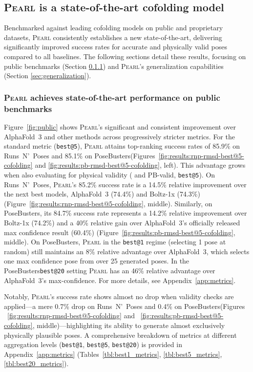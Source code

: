 \documentclass[11pt, letterpaper, onecolumn]{tau-class/tau}
\makeatletter
\newcommand{\pearl}{\textsc{Pearl}\xspace}
\newcommand{\alphafold}[1]{AlphaFold~#1\xspace}
\newcommand{\boltz}[1]{\mbox{Boltz-#1\xspace}}
\newcommand{\best}[1]{\texttt{best@#1}\xspace}
\newcommand{\rmsdtwoa}{\text{RMSD\,\raisebox{0.25ex}{\scriptsize <}\,2\,\AA}\xspace}
\newcommand{\runsnposes}{Runs~N'~Poses\xspace}
\newcommand{\posebusters}{PoseBusters\xspace}
\let\oldAA\AA
\renewcommand{\AA}{\oldAA\xspace}
\makeatother
\begin{document}
\subsection{\pearl is a state-of-the-art cofolding model}
\label{sec:results:cofolding}

Benchmarked against leading cofolding models on public and proprietary datasets, \pearl consistently establishes a new state-of-the-art, delivering significantly improved success rates for accurate and physically valid poses compared to all baselines. The following sections detail these results, focusing on public benchmarks (Section \ref{sec:public}) and \pearl's generalization capabilities (Section \ref{sec:generalization}).


\subsubsection{\pearl achieves state-of-the-art performance on public benchmarks}
\label{sec:public}

Figure~\ref{fig:public} shows \pearl's significant and consistent improvement over \alphafold3 and other methods across progressively stricter metrics. For the standard \rmsdtwoa metric (\best5), \pearl attains top-ranking success rates of 85.9\% on \runsnposes and 85.1\% on \posebusters (Figures~\ref{fig:results:rnp-rmsd-best@5-cofolding} and \ref{fig:results:pb-rmsd-best@5-cofolding}, left). This advantage grows when also evaluating for physical validity (\rmsdtwoa and PB-valid, \best5). On \runsnposes, \pearl's 85.2\% success rate is a 14.5\% relative improvement over the next best models, \alphafold3 (74.4\%) and \boltz1x (74.3\%) (Figure~\ref{fig:results:rnp-rmsd-best@5-cofolding}, middle). Similarly, on \posebusters, its 84.7\% success rate represents a 14.2\% relative improvement over \boltz1x (74.2\%) and a 40\% relative gain over \alphafold3's officially released max confidence result (60.4\%) (Figure~\ref{fig:results:pb-rmsd-best@5-cofolding}, middle).
On \posebusters, \pearl in the \best{1} regime (selecting 1 pose at random) still maintains an 8\% relative advantage over \alphafold{3}, which selects one max confidence pose from over 25 generated poses.
In the \posebusters \best{20} setting \pearl has an 46\% relative advantage over \alphafold{3}'s max-confidence. For more details, see Appendix~\ref{app:metrics}.

Notably, \pearl's success rate shows almost no drop when validity checks are applied---a mere 0.7\% drop on \runsnposes and 0.4\% on \posebusters (Figures ~\ref{fig:results:rnp-rmsd-best@5-cofolding} and ~\ref{fig:results:pb-rmsd-best@5-cofolding}, middle)---highlighting its ability to generate almost exclusively physically plausible poses.
A comprehensive breakdown of metrics at different aggregation levels (\best1, \best5, \best{20}) is provided in Appendix~\ref{app:metrics} (Tables~\ref{tbl:best1_metrics}, \ref{tbl:best5_metrics}, \ref{tbl:best20_metrics}).
\end{document}
